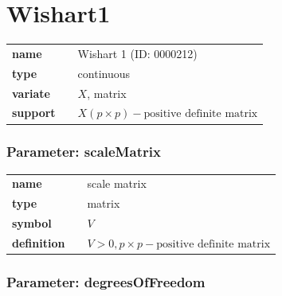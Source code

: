 %
%
\smallskip\section*{Wishart1} 

  \bigskip 

\begin{tabular}{p{2cm}cl}
\textbf{name} & & Wishart 1 (ID: 0000212)\\ 
 
\textbf{type} & & continuous \\ 

\textbf{variate} & & $X$, matrix \\ 

\textbf{support} & & $X(p \times p) - \text{positive definite matrix}$
\end{tabular}
\subsubsection*{Parameter: scaleMatrix}

\noindent\begin{tabular}{p{2cm}cl}
\textbf{name} & & scale matrix \\
\textbf{type} & & matrix \\
\textbf{symbol} & & $V$  \\
\textbf{definition} & & $V > 0, p\times p - \text{positive definite matrix}$
\end{tabular}
\subsubsection*{Parameter: degreesOfFreedom}

